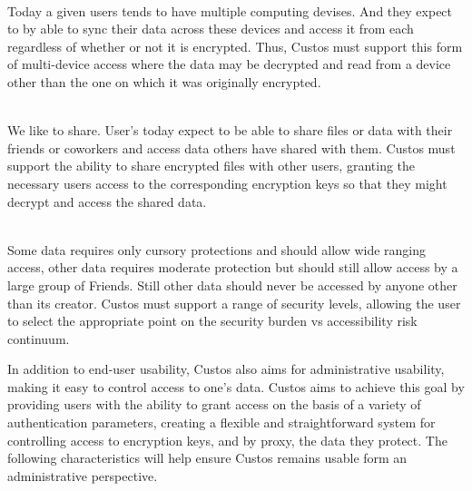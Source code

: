 \begin{packed_desc}
\item[Multi-Device Support] \hfill \\ Today a given users tends to
  have multiple computing devises. And they expect to by able to sync
  their data across these devices and access it from each regardless
  of whether or not it is encrypted. Thus, Custos must support this
  form of multi-device access where the data may be decrypted and read
  from a device other than the one on which it was originally
  encrypted.
\item[Multi-User Support] \hfill \\ We like to share. User's today
  expect to be able to share files or data with their friends or
  coworkers and access data others have shared with them. Custos must
  support the ability to share encrypted files with other users,
  granting the necessary users access to the corresponding encryption
  keys so that they might decrypt and access the shared data.
\item[Flexible Protection Semantics] \hfill \\ Some data requires only
  cursory protections and should allow wide ranging access, other data
  requires moderate protection but should still allow access by a
  large group of Friends. Still other data should never be accessed by
  anyone other than its creator. Custos must support a range of
  security levels, allowing the user to select the appropriate point
  on the security burden vs accessibility risk continuum.
\end{packed_desc}

In addition to end-user usability, Custos also aims for administrative
usability, making it easy to control access to one's data. Custos aims
to achieve this goal by providing users with the ability to grant
access on the basis of a variety of authentication parameters,
creating a flexible and straightforward system for controlling access
to encryption keys, and by proxy, the data they protect. The following
characteristics will help ensure Custos remains usable form an
administrative perspective.

